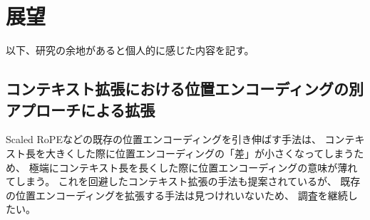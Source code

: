 \documentclass{jsarticle}
\begin{document}
\section{展望}
    以下、研究の余地があると個人的に感じた内容を記す。

    \subsection{コンテキスト拡張における位置エンコーディングの別アプローチによる拡張}
        Scaled RoPEなどの既存の位置エンコーディングを引き伸ばす手法は、
        コンテキスト長を大きくした際に位置エンコーディングの「差」が小さくなってしまうため、
        極端にコンテキスト長を長くした際に位置エンコーディングの意味が薄れてしまう。
        これを回避したコンテキスト拡張の手法も提案されているが、
        既存の位置エンコーディングを拡張する手法は見つけれいないため、
        調査を継続したい。
\end{document}
